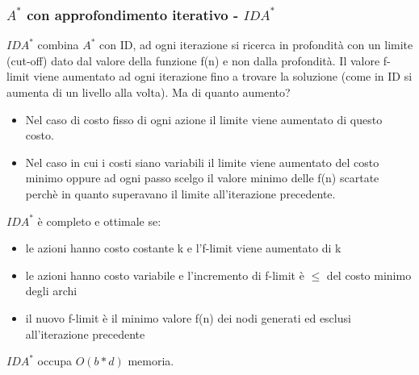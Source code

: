 \documentclass{article}
\begin{document}
\subsubsection{$A^*$ con approfondimento iterativo - $IDA^*$}
$IDA^*$ combina $A^*$ con ID, ad ogni iterazione si ricerca in profondità con un limite (cut-off) dato dal valore della funzione f(n) e non dalla profondità. Il valore f-limit viene aumentato ad ogni iterazione fino a trovare la soluzione (come in ID si aumenta di un livello alla volta). Ma di quanto aumento? 
\begin{itemize}
    \item Nel caso di costo fisso di ogni azione il limite viene aumentato di questo costo.
    \item Nel caso in cui i costi siano variabili il limite viene aumentato del costo minimo oppure ad ogni passo scelgo il valore minimo delle f(n) scartate perchè in quanto superavano il limite all'iterazione precedente.
\end{itemize}
$IDA^*$ è completo e ottimale se:
\begin{itemize}
    \item le azioni hanno costo costante k e l'f-limit viene aumentato di k
    \item le azioni hanno costo variabile e l'incremento di f-limit è $\leq$ del costo minimo degli archi
    \item il nuovo f-limit è il minimo valore f(n) dei nodi generati ed esclusi all'iterazione precedente
\end{itemize}
$IDA^*$ occupa $O(b*d)$ memoria.
\clearpage
\end{document}
